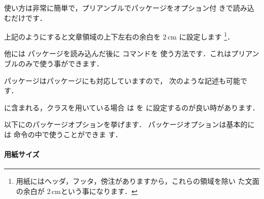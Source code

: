 使い方は非常に簡単で，プリアンブルでパッケージをオプション付
きで読み込むだけです．

\begin{InTeX}
\usepackage[margin=2cm]{geometry}
\end{InTeX}

上記のようにすると文章領域の上下左右の余白を 2\,cm に設定します
\footnote{用紙にはヘッダ，フッタ，傍注がありますから，これらの領域を除い
た文面の余白が 2\,cmという事になります．}．

他には  パッケージを読み込んだ後に  コマンドを
使う方法です．これはプリアンブルのみで使う事ができます．

\begin{InTeX}
\usepackage[a5paper]{geometry} 
\geometry{height=10in}
\end{InTeX}

パッケージはパッケージにも対応していますので，
次のような記述も可能です．

\begin{InTeX}
\usepackage{calc}
\usepackage[textheight=20\baselineskip+10pt]{geometry}
\end{InTeX}

に含まれる，クラスを用いている場合
は  を  に設定するのが良い時があります．

\begin{InTeX}
\setlength \fullwidth{\textwidth}
\end{InTeX}

以下にのパッケージオプションを挙げます．
パッケージオプションは基本的には  命令の中で使うことができま
す．

\newcommand*\twoargs[2]{\texttt{\lb}\va{#1}\str,\va{#2}\texttt{\rb}}
\newcommand*\threeargs[3]{\texttt{\lb}\va{#1}\str,\va{#2}%
  \str,\va{#3}\texttt{\rb}}

\paragraph{用紙サイズ}

